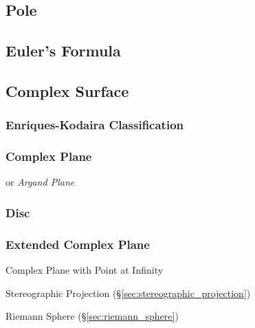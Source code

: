 \subsection{Pole}\label{sec:complex_pole}

\subsection{Euler's Formula}\label{sec:eulers_formula}

\subsection{Complex Surface}\label{sec:complex_surface}

\subsubsection{Enriques-Kodaira Classification}
\label{sec:enriques_kodaira}

\subsubsection{Complex Plane}\label{sec:complex_plane}

or \emph{Argand Plane}



\subsubsection{Disc}\label{sec:disc}\hfill

\subsubsection{Extended Complex Plane}\label{sec:extended_complex_plane}

Complex Plane with Point at Infinity

Stereographic Projection (\S\ref{sec:stereographic_projection})

Riemann Sphere (\S\ref{sec:riemann_sphere})



